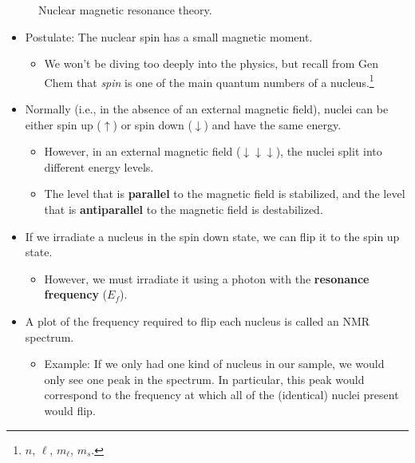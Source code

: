 \documentclass[../notes.tex]{subfiles}
\begin{document}
\begin{itemize}
\begin{figure}[h!]
        \caption{Nuclear magnetic resonance theory.}
        \label{fig:theoryNMR}
    \end{figure}
    \begin{itemize}
        \item Postulate: The nuclear spin has a small magnetic moment.
        \begin{itemize}
            \item We won't be diving too deeply into the physics, but recall from Gen Chem that \emph{spin} is one of the main quantum numbers of a nucleus.\footnote{$n$, $\ell$, $m_\ell$, $m_s$.}
        \end{itemize}
        \item Normally (i.e., in the absence of an external magnetic field), nuclei can be either spin up ($\uparrow$) or spin down ($\downarrow$) and have the same energy.
        \begin{itemize}
            \item However, in an external magnetic field ($\downarrow\downarrow\downarrow$), the nuclei split into different energy levels.
            \item The level that is \textbf{parallel} to the magnetic field is stabilized, and the level that is \textbf{antiparallel} to the magnetic field is destabilized.
        \end{itemize}
        \item If we irradiate a nucleus in the spin down state, we can flip it to the spin up state.
        \begin{itemize}
            \item However, we must irradiate it using a photon with the \textbf{resonance frequency} ($E_f$).
        \end{itemize}
        \item A plot of the frequency required to flip each nucleus is called an NMR spectrum.
        \begin{itemize}
            \item Example: If we only had one kind of nucleus in our sample, we would only see one peak in the spectrum. In particular, this peak would correspond to the frequency at which all of the (identical) nuclei present would flip.

\end{itemize}
\end{itemize}
\end{itemize}
\end{document}
